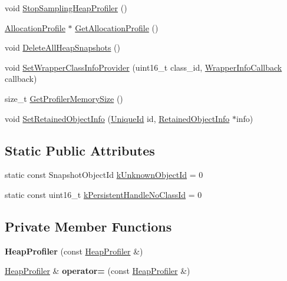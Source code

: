 \begin{DoxyCompactItemize}
\item 
void \hyperlink{classv8_1_1_heap_profiler_abc43e12e6febb087be251c0629ff17bf}{Stop\+Sampling\+Heap\+Profiler} ()
\item 
\hyperlink{classv8_1_1_allocation_profile}{Allocation\+Profile} $\ast$ \hyperlink{classv8_1_1_heap_profiler_aaadb22168da6a2889796ed3b5638cd50}{Get\+Allocation\+Profile} ()
\item 
void \hyperlink{classv8_1_1_heap_profiler_a6a75bcc6d8350858597b6a6ce5e349a2}{Delete\+All\+Heap\+Snapshots} ()
\item 
void \hyperlink{classv8_1_1_heap_profiler_a7744cf111ad9c6b0b409841f8ed8bcdd}{Set\+Wrapper\+Class\+Info\+Provider} (uint16\+\_\+t class\+\_\+id, \hyperlink{classv8_1_1_heap_profiler_a677025dd201fd832e0464e5ab0b0d0d4}{Wrapper\+Info\+Callback} callback)
\item 
size\+\_\+t \hyperlink{classv8_1_1_heap_profiler_a76435e93466db7519fb31417ea39b13e}{Get\+Profiler\+Memory\+Size} ()
\item 
void \hyperlink{classv8_1_1_heap_profiler_a70821ff8e1c2cc92c310c5c4f1fa5ec7}{Set\+Retained\+Object\+Info} (\hyperlink{classv8_1_1_unique_id}{Unique\+Id} id, \hyperlink{classv8_1_1_retained_object_info}{Retained\+Object\+Info} $\ast$info)
\end{DoxyCompactItemize}
\subsection*{Static Public Attributes}
\begin{DoxyCompactItemize}
\item 
static const Snapshot\+Object\+Id \hyperlink{classv8_1_1_heap_profiler_abf2b9d8facb18473f9b124ab8baf5786}{k\+Unknown\+Object\+Id} = 0
\item 
static const uint16\+\_\+t \hyperlink{classv8_1_1_heap_profiler_a272c9af3ea5cd90a2737af3d22a7eb78}{k\+Persistent\+Handle\+No\+Class\+Id} = 0
\end{DoxyCompactItemize}
\subsection*{Private Member Functions}
\begin{DoxyCompactItemize}
\item 
{\bfseries Heap\+Profiler} (const \hyperlink{classv8_1_1_heap_profiler}{Heap\+Profiler} \&)\hypertarget{classv8_1_1_heap_profiler_abb7dd8b5c784388e6ca2266344f18056}{}\label{classv8_1_1_heap_profiler_abb7dd8b5c784388e6ca2266344f18056}

\item 
\hyperlink{classv8_1_1_heap_profiler}{Heap\+Profiler} \& {\bfseries operator=} (const \hyperlink{classv8_1_1_heap_profiler}{Heap\+Profiler} \&)\hypertarget{classv8_1_1_heap_profiler_a9792e8ddde522f8e2aa97005c0e6bc8f}{}\label{classv8_1_1_heap_profiler_a9792e8ddde522f8e2aa97005c0e6bc8f}

\end{DoxyCompactItemize}


